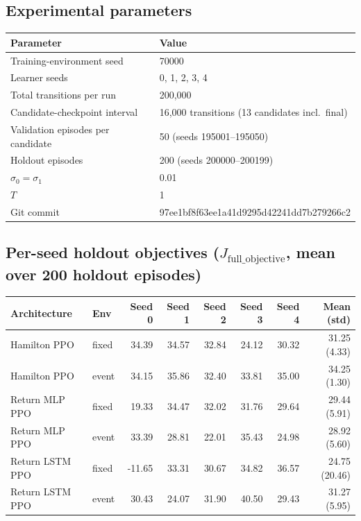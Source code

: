 
\subsection*{Experimental parameters}
\begin{table}[h]
\centering
\begin{tabular}{ll}
\hline
Parameter & Value \\
\hline
Training-environment seed & 70000 \\
Learner seeds & 0, 1, 2, 3, 4 \\
Total transitions per run & 200{,}000 \\
Candidate-checkpoint interval & 16{,}000 transitions (13 candidates incl.\ final) \\
Validation episodes per candidate & 50 (seeds 195001--195050) \\
Holdout episodes & 200 (seeds 200000--200199) \\
$\sigma_0=\sigma_1$ & 0.01 \\
$T$ & 1 \\
Git commit & 97ee1bf8f63ee1a41d9295d42241dd7b279266c2 \\
\hline
\end{tabular}
\end{table}

\subsection*{Per-seed holdout objectives ($J_{\text{full\_objective}}$, mean over 200 holdout episodes)}
\begin{table}[h]
\centering
\begin{tabular}{llrrrrrr}
\hline
Architecture & Env & Seed 0 & Seed 1 & Seed 2 & Seed 3 & Seed 4 & Mean (std) \\
\hline
Hamilton PPO      & fixed & 34.39 & 34.57 & 32.84 & 24.12 & 30.32 & 31.25 (4.33) \\
Hamilton PPO      & event & 34.15 & 35.86 & 32.40 & 33.81 & 35.00 & 34.25 (1.30) \\
Return MLP PPO    & fixed & 19.33 & 34.47 & 32.02 & 31.76 & 29.64 & 29.44 (5.91) \\
Return MLP PPO    & event & 33.39 & 28.81 & 22.01 & 35.43 & 24.98 & 28.92 (5.60) \\
Return LSTM PPO   & fixed & -11.65 & 33.31 & 30.67 & 34.82 & 36.57 & 24.75 (20.46) \\
Return LSTM PPO   & event & 30.43 & 24.07 & 31.90 & 40.50 & 29.43 & 31.27 (5.95) \\
\hline
\end{tabular}
\end{table}

